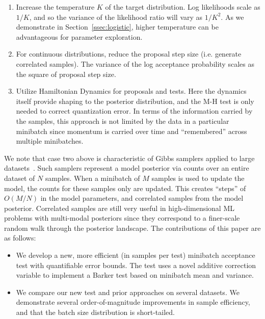 \documentclass[letterpaper]{article}
\begin{document}
\begin{enumerate}[noitemsep]
    \item Increase the temperature $K$ of the target distribution. Log
    likelihoods scale as $1/K$, and so the variance of the likelihood ratio will
    vary as $1/K^2$. As we demonstrate in Section~\ref{ssec:logistic}, higher
    temperature can be advantageous for parameter exploration.

    \item For continuous distributions, reduce the proposal step size
      (i.e. generate correlated samples). The variance of the log
      acceptance probability scales as the square of proposal step
      size.

  \item Utilize Hamiltonian Dynamics for proposals and tests. Here the
    dynamics itself provide shaping to the posterior distribution, and
    the M-H test is only needed to correct quantization error. In terms
    of the information carried by the samples, this approach is not
    limited by the data in a particular minibatch since momentum is
    carried over time and ``remembered'' across multiple
    minibatches.
\end{enumerate}

We note that case two above is characteristic of Gibbs samplers applied to
large datasets~\citep{dupuy2016}. Such samplers represent a
model posterior via counts over an entire dataset of $N$ samples. When
a minibatch of $M$ samples is used to update the model, the counts for
these samples only are updated. This creates ``steps'' of $O(M/N)$
in the model parameters, and correlated samples from the model
posterior. Correlated samples are still very useful in high-dimensional
ML problems with multi-modal posteriors since they correspond to a finer-scale
random walk through the posterior landscape.  The contributions of this paper
are as follows:

\begin{itemize}[noitemsep]
    \item We develop a new, more efficient (in samples per test) minibatch
    acceptance test with quantifiable error bounds. The test uses a novel
    additive correction variable to implement a Barker test based on minibatch
    mean and variance. 

    \item We compare our new test and prior approaches on several
      datasets. We demonstrate several order-of-magnitude improvements in sample efficiency,
      and that the batch size distribution is short-tailed. 
\end{itemize}
\end{document}
